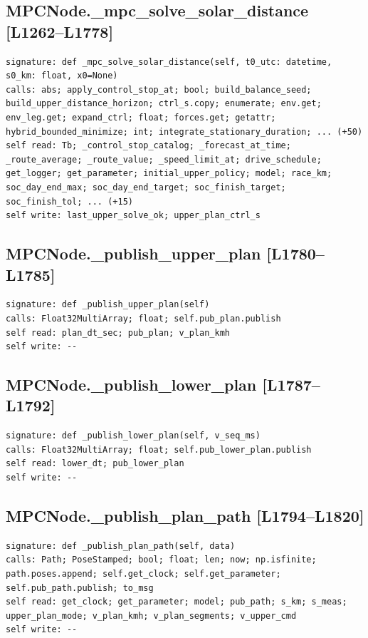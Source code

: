 \documentclass[a4paper,10pt,oneside]{book}
\begin{document}
\subsection*{MPCNode.\_mpc\_solve\_solar\_distance [L1262--L1778]}
\begin{lstlisting}[numbers=none]
signature: def _mpc_solve_solar_distance(self, t0_utc: datetime, s0_km: float, x0=None)
calls: abs; apply_control_stop_at; bool; build_balance_seed; build_upper_distance_horizon; ctrl_s.copy; enumerate; env.get; env_leg.get; expand_ctrl; float; forces.get; getattr; hybrid_bounded_minimize; int; integrate_stationary_duration; ... (+50)
self read: Tb; _control_stop_catalog; _forecast_at_time; _route_average; _route_value; _speed_limit_at; drive_schedule; get_logger; get_parameter; initial_upper_policy; model; race_km; soc_day_end_max; soc_day_end_target; soc_finish_target; soc_finish_tol; ... (+15)
self write: last_upper_solve_ok; upper_plan_ctrl_s
\end{lstlisting}
\subsection*{MPCNode.\_publish\_upper\_plan [L1780--L1785]}
\begin{lstlisting}[numbers=none]
signature: def _publish_upper_plan(self)
calls: Float32MultiArray; float; self.pub_plan.publish
self read: plan_dt_sec; pub_plan; v_plan_kmh
self write: --
\end{lstlisting}
\subsection*{MPCNode.\_publish\_lower\_plan [L1787--L1792]}
\begin{lstlisting}[numbers=none]
signature: def _publish_lower_plan(self, v_seq_ms)
calls: Float32MultiArray; float; self.pub_lower_plan.publish
self read: lower_dt; pub_lower_plan
self write: --
\end{lstlisting}
\subsection*{MPCNode.\_publish\_plan\_path [L1794--L1820]}
\begin{lstlisting}[numbers=none]
signature: def _publish_plan_path(self, data)
calls: Path; PoseStamped; bool; float; len; now; np.isfinite; path.poses.append; self.get_clock; self.get_parameter; self.pub_path.publish; to_msg
self read: get_clock; get_parameter; model; pub_path; s_km; s_meas; upper_plan_mode; v_plan_kmh; v_plan_segments; v_upper_cmd
self write: --
\end{lstlisting}
\end{document}
